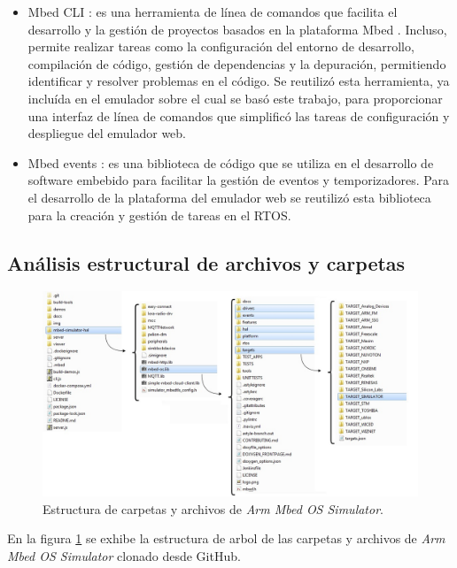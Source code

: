 \begin{itemize}
    \item Mbed CLI \citep{MbedCLI}: es una herramienta de línea de comandos que facilita el desarrollo y la gestión de proyectos basados en la plataforma Mbed \citep{ArmMbed}. Incluso, permite realizar tareas como la configuración del entorno de desarrollo, compilación de código, gestión de dependencias y la depuración, permitiendo identificar y resolver problemas en el código. Se reutilizó esta herramienta, ya incluída en el emulador sobre el cual se basó este trabajo, para proporcionar una interfaz de línea de comandos que simplificó las tareas de configuración y despliegue del emulador web.
 
    
     \item Mbed events \citep{ArmMbed}: es una biblioteca de código que se utiliza en el desarrollo de software embebido para facilitar la gestión de eventos y temporizadores. Para el desarrollo de la plataforma del emulador web se reutilizó esta biblioteca para la creación y gestión de tareas en el RTOS.
     
\end{itemize}

\subsection{Análisis estructural de archivos y carpetas}

\begin{figure}[ht]
	\centering
	\includegraphics[scale=.37]{./Figures/estructuraMbed.jpg}
	\caption{Estructura de carpetas y archivos de \textit{Arm Mbed OS Simulator}.}
	\label{fig:estructuraMbed}
\end{figure}

En la figura \ref{fig:estructuraMbed} se exhibe la estructura de arbol de las carpetas y archivos de \textit{Arm Mbed OS Simulator} clonado desde GitHub.

